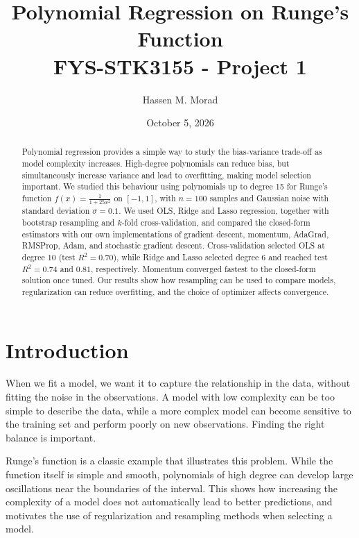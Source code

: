 \documentclass[amssymb,twocolumn,aps]{revtex4}
\begin{document}
\title{Polynomial Regression on Runge's Function\\
    \normalsize FYS-STK3155 - Project 1}
\date{October 5, 2026}
\author{Hassen M. Morad}

\newpage

\begin{abstract}
    Polynomial regression provides a simple way to study the bias-variance trade-off as model complexity increases. High-degree polynomials can reduce bias, but simultaneously increase variance and lead to overfitting, making model selection important. We studied this behaviour using polynomials up to degree 15 for Runge's function $f(x) = \frac{1}{1+25x^2}$ on $[-1,1]$, with $n=100$ samples and Gaussian noise with standard deviation $\sigma=0.1$. We used OLS, Ridge and Lasso regression, together with bootstrap resampling and $k$-fold cross-validation, and compared the closed-form estimators with our own implementations of gradient descent, momentum, AdaGrad, RMSProp, Adam, and stochastic gradient descent. Cross-validation selected OLS at degree 10 (test $R^2=0.70$), while Ridge and Lasso selected degree 6 and reached test $R^2=0.74$ and $0.81$, respectively. Momentum converged fastest to the closed-form solution once tuned. Our results show how resampling can be used to compare models, regularization can reduce overfitting, and the choice of optimizer affects convergence.
\end{abstract}

\maketitle

\section{Introduction}
When we fit a model, we want it to capture the relationship in the data, without fitting the noise in the observations. A model with low complexity can be too simple to describe the data, while a more complex model can become sensitive to the training set and perform poorly on new observations. Finding the right balance is important.

Runge's function is a classic example that illustrates this problem. While the function itself is simple and smooth, polynomials of high degree can develop large oscillations near the boundaries of the interval. This shows how increasing the complexity of a model does not automatically lead to better predictions, and motivates the use of regularization and resampling methods when selecting a model.
\end{document}
